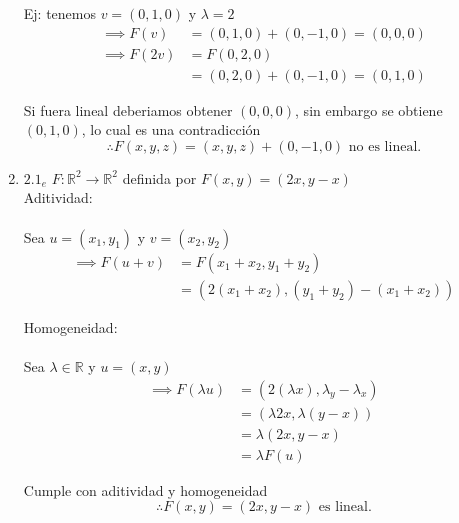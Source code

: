 \documentclass{article}
\begin{document}
\begin{enumerate}
			Ej: tenemos \(v=(0,1,0)\) y \(\lambda =2\)
			\begin{equation*}
				\begin{aligned}
					\implies F(v) &=(0,1,0)+(0,-1,0)=(0,0,0)\\
					\implies F(2v) &=F(0,2,0)\\ 
									&=(0,2,0)+(0,-1,0)=(0,1,0)
				\end{aligned}
			\end{equation*}
			
			Si fuera lineal deberiamos obtener \((0,0,0)\), sin embargo se obtiene \((0,1,0)\), lo cual es una contradicción
			\begin{equation*}
				\boxed{ \therefore F(x,y,z)=(x,y,z)+(0,-1,0)} \text{ no es lineal.}
			\end{equation*}
			
			\item \(2.1_e\) 
			\(F: \mathbb{R}^2 \to \mathbb{R}^2\) definida por \(F(x,y)=(2x,y-x)\)\\
			
			Aditividad:\\
			\\Sea \(u=(x_1,y_1)\) y \(v=(x_2,y_2)\)
			\begin{equation*}
				\begin{aligned}
					\implies F(u+v) &=F(x_1+x_2,y_1+y_2)\\
									&=(2(x_1+x_2),(y_1+y_2)-(x_1+x_2))
				\end{aligned}
			\end{equation*}
			
			Homogeneidad:\\
			\\Sea \(\lambda \in \mathbb{R}\) y \(u=(x,y)\)
			\begin{equation*}
				\begin{aligned}
					\implies F(\lambda u) &=(2(\lambda x),\lambda_y-\lambda_x)\\
										  &=(\lambda 2x, \lambda (y-x))\\
										  &=\lambda (2x,y-x)\\
										  &=\lambda F(u)
				\end{aligned}
			\end{equation*}
			
			Cumple con aditividad y homogeneidad
			\begin{equation*}
				\boxed{\therefore F(x,y)=(2x,y-x)} \text{ es lineal.}
			\end{equation*}
			
		\end{enumerate}
		
\end{document}
